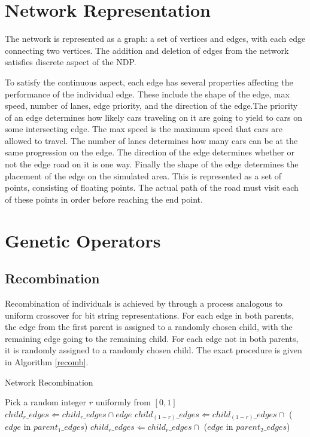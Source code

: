 \documentclass[11pt, oneside, notitlepage, final]{article}
\begin{document}
    \section{Network Representation}
        The network is represented as a graph: a set of vertices and edges, with each edge connecting two vertices. The addition and deletion of edges from the network satisfies discrete aspect of the NDP.

        To satisfy the continuous aspect, each edge has several properties affecting the performance of the individual edge. These include the shape of the edge, max speed, number of lanes, edge priority, and the direction of the edge.The priority of an edge determines how likely cars traveling on it are going to yield to cars on some intersecting edge. The max speed is the maximum speed that cars are allowed to travel. The number of lanes determines how many cars can be at the same progression on the edge. The direction of the edge determines whether or not the edge road on it is one way. Finally the shape of the edge determines the placement of the edge on the simulated area. This is represented as a set of points, consisting of floating points. The actual path of the road must visit each of these points in order before reaching the end point.





    \section{Genetic Operators}
        \subsection{Recombination}
            Recombination of individuals is achieved by through a process analogous to uniform crossover for bit string representations. For each edge in both parents, the edge from the first parent is assigned to a randomly chosen child, with the remaining edge going to the remaining child. For each edge not in both parents, it is randomly assigned to a randomly chosen child. The exact procedure is given in Algorithm \ref{recomb}.

            \begin{algorithm}
            \caption{Network Recombination}
            \label{recomb}
            \begin{algorithmic}
            \STATE Pick a random integer $r$ uniformly from $[0,1]$
            \STATE $child_r\_edges \Leftarrow child_r\_edges \cap edge$ 
            \ELSE
            \STATE $child_{(1-r)}\_edges \Leftarrow child_{(1-r)}\_edges \cap$ ($edge$ in $parent_1\_edges$)
            \STATE $child_r\_edges \Leftarrow child_r\_edges \cap$ ($edge$ in $parent_2\_edges$)
            \ENDIF
            \ENDFOR
            \end{algorithmic}
            \end{algorithm}
\end{document}

